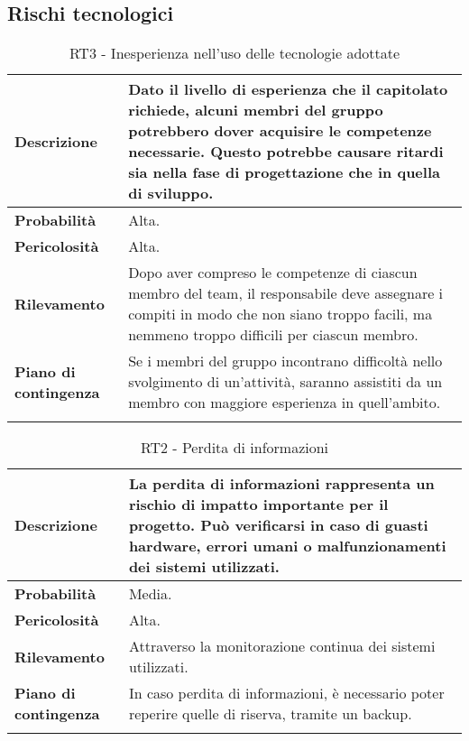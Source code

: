 \newpage


\subsection{Rischi tecnologici}
\begin{longtable}{|l|p{10cm}|}
    \hline
    \textbf{Descrizione} & Dato il livello di esperienza che il capitolato richiede,  alcuni membri del gruppo potrebbero dover acquisire le competenze necessarie. Questo potrebbe causare ritardi sia nella fase di progettazione che in quella di sviluppo.  \\ 
    \hline
    \textbf{Probabilità} & Alta. \\
    \hline
    \textbf{Pericolosità} & Alta. \\
    \hline
    \textbf{Rilevamento} & Dopo aver compreso le competenze di ciascun membro del team, il responsabile deve assegnare i compiti in modo che non siano troppo facili, ma nemmeno troppo difficili per ciascun membro. \\
    \hline
    \textbf{Piano di contingenza} & Se i membri del gruppo incontrano difficoltà nello svolgimento di un'attività, saranno assistiti da un membro con maggiore esperienza in quell'ambito. \\
    \hline
    \caption{RT3 - Inesperienza nell'uso delle tecnologie adottate}
    \label{table:5}
\end{longtable}

\newpage

\begin{longtable}{|l|p{10cm}|}
    \hline
    \textbf{Descrizione} & La perdita di informazioni rappresenta un rischio di impatto importante per il progetto. Può verificarsi in caso di guasti hardware, errori umani o malfunzionamenti dei sistemi utilizzati. \\ 
    \hline
    \textbf{Probabilità} & Media. \\
    \hline
    \textbf{Pericolosità} & Alta. \\
    \hline
    \textbf{Rilevamento} & Attraverso la monitorazione continua dei sistemi utilizzati. \\
    \hline
    \textbf{Piano di contingenza} & In caso perdita di informazioni, è necessario poter reperire quelle di riserva, tramite un backup. \\
    \hline
    \caption{RT2 - Perdita di informazioni}
    \label{table:6}
\end{longtable}

